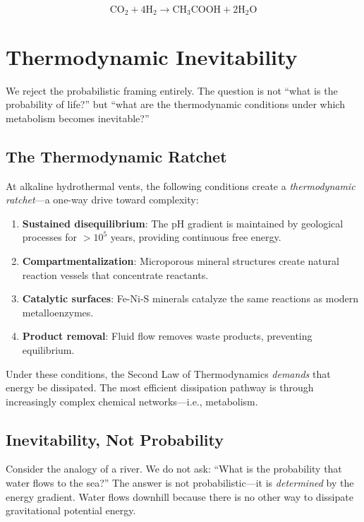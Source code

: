 \documentclass[11pt,twocolumn]{article}
\begin{document}
\begin{equation}
\text{CO}_2 + 4\text{H}_2 \rightarrow \text{CH}_3\text{COOH} + 2\text{H}_2\text{O}
\end{equation}

\section{Thermodynamic Inevitability}

We reject the probabilistic framing entirely. The question is not ``what is the probability of life?'' but ``what are the thermodynamic conditions under which metabolism becomes inevitable?''

\subsection{The Thermodynamic Ratchet}

At alkaline hydrothermal vents, the following conditions create a \textit{thermodynamic ratchet}—a one-way drive toward complexity:

\begin{enumerate}
\item \textbf{Sustained disequilibrium}: The pH gradient is maintained by geological processes for $>10^5$ years, providing continuous free energy.

\item \textbf{Compartmentalization}: Microporous mineral structures create natural reaction vessels that concentrate reactants.

\item \textbf{Catalytic surfaces}: Fe-Ni-S minerals catalyze the same reactions as modern metalloenzymes.

\item \textbf{Product removal}: Fluid flow removes waste products, preventing equilibrium.
\end{enumerate}

Under these conditions, the Second Law of Thermodynamics \textit{demands} that energy be dissipated. The most efficient dissipation pathway is through increasingly complex chemical networks—i.e., metabolism.

\subsection{Inevitability, Not Probability}

Consider the analogy of a river. We do not ask: ``What is the probability that water flows to the sea?'' The answer is not probabilistic—it is \textit{determined} by the energy gradient. Water flows downhill because there is no other way to dissipate gravitational potential energy.
\end{document}
